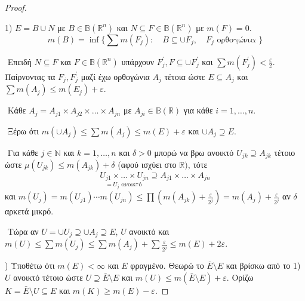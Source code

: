 \begin{proof} $ $

    1) $E = B \cup N$ με $B \in \mathbb B ( \mathbb R^n )$ και $N \subseteq F \in \mathbb B (\mathbb R^n)$ με $m(F) = 0$.
    $$m(B) = \inf \{ \sum m(F_j): \quad B \subseteq \cup F_j, \quad F_j \text{ ορθογώνια }\}$$

    $ $\newline
    Επειδή $N\subseteq F$ και $F \in \mathbb B (\mathbb R^n)$ υπάρχουν $F^{\prime}_j, F \subseteq \cup F^{\prime}_j$ και $\sum m(F^{\prime}_j) < \frac{\varepsilon}{2}$. Παίρνοντας τα $F_j, F^{\prime}_j$ μαζί έχω ορθογώνια $A_j$ τέτοια ώστε $E \subseteq A_j$ και $\sum m(A_j) \leq m(E_j) + \varepsilon$.

    $ $\newline
    Κάθε $A_j = A_{j1} \times A_{j2} \times \ldots \times A_{jn}$ με $A_{ji} \in \mathbb B(\mathbb R)$ για κάθε $i=1,\ldots,n$.

    $ $\newline
    Ξέρω ότι $m(\cup A_j) \leq \sum m(A_j) \leq m(E) + \varepsilon$ και $\cup A_j \supseteq E$.

    $ $\newline
    Για κάθε $j \in \mathbb N$ και $k=1,\ldots,n$ και $\delta >0$ μπορώ να βρω ανοικτό $U_{jk} \supseteq A_{jk}$ τέτοιο ώστε $μ(U_{jk}) \leq m(A_{jk}) + \delta$ (αφού ισχύει στο $\mathbb{R})$, τότε 
    $$\underset{=U_j \text{ ανοικτό }}{ U_{j1} \times \ldots \times U_{jn}} \supseteq A_{j1} \times \ldots \times A_{jn}$$ και $m(U_j) = m(U_{j1})\cdots m(U_{jn}) \leq \prod \left( m(A_{jk}) + \frac{\varepsilon}{2^j}\right) = m(A_j) + \frac{\varepsilon}{2^j}$ αν $\delta$ αρκετά μικρό.

    $ $\newline
    Τώρα αν $U = \cup U_j \supseteq \cup A_j \supseteq E$, $U$ ανοικτό και $m(U) \leq \sum m(U_j) \leq \sum m(A_j) + \sum\frac{\varepsilon}{2^j} \leq m(E) + 2\varepsilon$.


    $ $) Υποθέτω ότι $m(E) <\infty$ και $E$ φραγμένο. Θεωρώ το $\bar E\setminus E$ και βρίσκω από το 1) $U$ ανοικτό τέτοιο ώστε $U \supseteq \bar{E}\setminus E$ και $m(U) \leq m(\bar{E}\setminus E) + \varepsilon$. Ορίζω $K = \bar{E}\setminus U \subseteq E$ και $m(K) \geq m(E)-\varepsilon$.
\end{proof}

